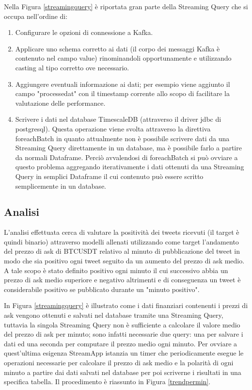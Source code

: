 Nella Figura \ref{streamingquery} è riportata gran parte della Streaming Query che si occupa
nell'ordine di:
\begin{enumerate}
    \item Configurare le opzioni di connessione a Kafka.
    \item Applicare uno schema corretto ai dati (il corpo dei messaggi Kafka è contenuto nel campo
    value) rinominandoli opportunamente e utilizzando casting al tipo corretto ove necessario.
    \item Aggiungere eventuali informazione ai dati; per esempio viene aggiunto il campo
    "processedat" con il timestamp corrente allo scopo di facilitare la valutazione delle performance.
    \item Scrivere i dati nel database TimescaleDB (attraverso il driver jdbc di postgresql). Questa
    operazione viene svolta attraverso la direttiva foreachBatch in quanto attualmente non è
    possibile scrivere dati da una Streaming Query direttamente in un database, ma è possibile farlo a
    partire da normali Dataframe. Perciò avvalendosi di foreachBatch si può ovviare a questo
    problema aggregando iterativamente i dati ottenuti da una Streaming Query in semplici Dataframe
    il cui contenuto può essere scritto semplicemente in un database.

\end{enumerate}

\subsection{Analisi}

L'analisi effettuata cerca di valutare la positività dei tweets ricevuti (il target è quindi
binario) attraverso modelli allenati utilizzando come target
l'andamento del prezzo di ask di BTCUSDT relativo al minuto di pubblicazione del tweet in modo
che sia positivo ogni tweet seguito da un aumento del prezzo di ask medio. A tale scopo
è stato definito positivo ogni
minuto il cui successivo abbia un prezzo di ask medio superiore e
negativo altrimenti e di conseguenza un tweet è considerabile positivo se pubblicato durante un
"minuto positivo".

In Figura \ref{streamingquery} è illustrato come i dati finanziari contenenti i prezzi di ask
vengono ottenuti e salvati nel database tramite una Streaming Query,
tuttavia la singola Streaming Query non è sufficiente
a calcolare il valore medio del prezzo di ask per minuto; sono infatti necessarie due query: una
per salvare i dati ed una seconda per computare il prezzo medio ogni minuto. Per ovviare a
quest'ultima esigenza StreamApp istanzia un timer che periodicamente esegue le operazioni necessarie
per calcolare il prezzo di ask medio e la polarità di ogni minuto a partire dai
dati salvati nel database per poi scriverne i risultati in una specifica tabella. Il procedimento
è riassunto in Figura \ref{trendpermin}.

